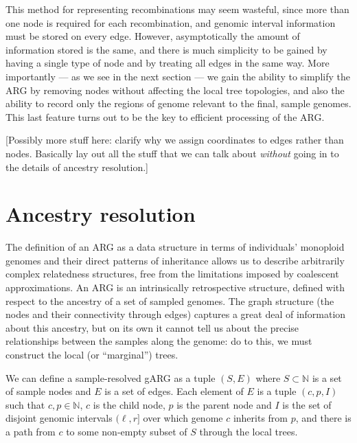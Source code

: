 \documentclass{article}
\begin{document}
This method for representing recombinations may seem wasteful,
since more than one node is required for each recombination,
and genomic interval information must be stored on every edge.
However, asymptotically the amount of information stored is the
same, and there is much simplicity to be gained by having
a single type of node and by treating all edges in the same way.
More importantly --- as we see in the next section --- we gain the
ability to simplify the ARG by removing nodes without affecting the
local tree topologies, and also the ability to record only the
regions of genome relevant to the final, sample genomes. This last
feature turns out to be the key to efficient processing of the ARG.

[Possibly more stuff here: clarify why we assign coordinates to edges
rather than nodes. Basically lay out all the stuff that we can
talk about \emph{without} going in to the details of
ancestry resolution.]


\section*{Ancestry resolution}\label{Ancestry_resolution}

The definition of an ARG as a data structure in terms of
individuals' monoploid genomes
and their direct patterns of inheritance allows us to describe arbitrarily
complex relatedness structures, free from the limitations imposed by
coalescent approximations.
An ARG is an intrinsically retrospective
structure, defined with respect to the ancestry of
a set of sampled genomes.
The graph structure (the nodes and their connectivity through edges)
captures a great deal of information about this ancestry,
but on its own it cannot tell us about the precise relationships between
the samples along the genome: do to this, we must construct the
local (or ``marginal'') trees.

We can define a sample-resolved gARG as a tuple $(S, E)$
where $S \subset \mathbb{N}$ is a set of sample nodes and
$E$ is a set of edges. Each element of $E$
is a tuple $(c, p, I)$ such that $c, p \in \mathbb{N}$,
$c$ is the child node, $p$ is the parent node and $I$ is the set of
disjoint genomic intervals $(\ell, r]$
over which genome $c$ inherits from $p$, and there is a path from
$c$ to some non-empty subset of $S$ through the local trees.
\end{document}

